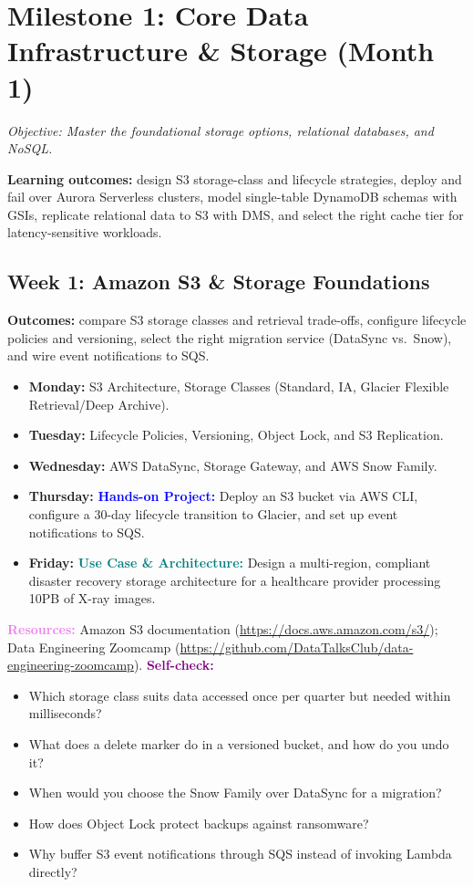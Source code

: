 \documentclass[11pt, a4paper]{article}
\newcommand{\project}[1]{\vspace{1mm}\noindent\textbf{\textcolor{blue}{Hands-on Project:}} #1}
\newcommand{\usecase}[1]{\vspace{1mm}\noindent\textbf{\textcolor{teal}{Use Case \& Architecture:}} #1}
\newcommand{\dayitem}[2]{\item \textbf{#1:} #2}
\newcommand{\resources}[1]{\vspace{1mm}\noindent\textbf{\textcolor{violet}{Resources:}} #1}
\newcommand{\selfcheck}[1]{\vspace{1mm}\noindent\textbf{\textcolor{purple}{Self-check:}} #1}
\begin{document}
\section{Milestone 1: Core Data Infrastructure \& Storage (Month 1)}
\textit{Objective: Master the foundational storage options, relational databases, and NoSQL.}
\par\noindent\textbf{Learning outcomes:} design S3 storage-class and lifecycle strategies, deploy and fail over Aurora Serverless clusters, model single-table DynamoDB schemas with GSIs, replicate relational data to S3 with DMS, and select the right cache tier for latency-sensitive workloads.

\subsection*{Week 1: Amazon S3 \& Storage Foundations}
\par\noindent\textbf{Outcomes:} compare S3 storage classes and retrieval trade-offs, configure lifecycle policies and versioning, select the right migration service (DataSync vs.\ Snow), and wire event notifications to SQS.
\begin{itemize}[label=-]
    \dayitem{Monday}{S3 Architecture, Storage Classes (Standard, IA, Glacier Flexible Retrieval/Deep Archive).}
    \dayitem{Tuesday}{Lifecycle Policies, Versioning, Object Lock, and S3 Replication.}
    \dayitem{Wednesday}{AWS DataSync, Storage Gateway, and AWS Snow Family.}
    \dayitem{Thursday}{\project{Deploy an S3 bucket via AWS CLI, configure a 30-day lifecycle transition to Glacier, and set up event notifications to SQS.}}
    \dayitem{Friday}{\usecase{Design a multi-region, compliant disaster recovery storage architecture for a healthcare provider processing 10PB of X-ray images.}}
\end{itemize}
\resources{Amazon S3 documentation (\url{https://docs.aws.amazon.com/s3/}); Data Engineering Zoomcamp (\url{https://github.com/DataTalksClub/data-engineering-zoomcamp}).}
\selfcheck{\begin{itemize}[label=-, leftmargin=1.5em, itemsep=0pt]
    \item Which storage class suits data accessed once per quarter but needed within milliseconds?
    \item What does a delete marker do in a versioned bucket, and how do you undo it?
    \item When would you choose the Snow Family over DataSync for a migration?
    \item How does Object Lock protect backups against ransomware?
    \item Why buffer S3 event notifications through SQS instead of invoking Lambda directly?
\end{itemize}}
\end{document}

